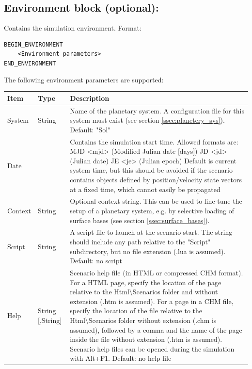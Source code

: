 \documentclass[Orbiter Developer Manual.tex]{subfiles}
\begin{document}
\subsection*{Environment block (optional):}
Contains the simulation environment. Format:

\begin{lstlisting}[language=OSFS]
BEGIN_ENVIRONMENT
	<Environment parameters>
END_ENVIRONMENT
\end{lstlisting}

\noindent
The following environment parameters are supported:

\begin{table}[H]
	\centering
	\begin{tabularx}{\textwidth}{ |l|l|X| }
	\hline\rule{0pt}{2ex}
	\textbf{Item} & \textbf{Type} & \textbf{Description}\\
	\hline\rule{0pt}{2ex}
	System & String & Name of the planetary system. A configuration file for this system must exist (see section \ref{ssec:planetery_sys}). Default: "Sol"\\
	\hline\rule{0pt}{2ex}
	Date &   & Contains the simulation start time. Allowed formats are:\newline
	MJD <mjd> (Modified Julian date [days])\newline
	JD <jd> (Julian date)\newline
	JE <je> (Julian epoch)\newline
	Default is current system time, but this should be avoided if the scenario contains objects defined by position/velocity  state vectors at a fixed time, which cannot easily be propagated\\
	\hline\rule{0pt}{2ex}
	Context & String & Optional context string. This can be used to fine-tune the setup of a planetary system, e.g. by selective loading of surface bases (see section \ref{ssec:surface_bases}).\\
	\hline\rule{0pt}{2ex}
	Script & String & A script file to launch at the scenario start. The string should include any path relative to the "Script" subdirectory, but no file extension (.lua is assumed). Default: no script\\
	\hline\rule{0pt}{2ex}
	Help & String [,String] & Scenario help file (in HTML or compressed CHM format). For a HTML page, specify the location of the page relative to the Html\textbackslash Scenarios folder and without extension (.htm is assumed). For a page in a CHM file, specify the location of the file relative to the Html\textbackslash Scenarios folder without extension (.chm is assumed), followed by a comma and the name of the page inside the file without extension (.htm is assumed). Scenario help files can be opened during the simulation with Alt+F1. Default: no help file\\

\end{tabularx}
\end{table}
\end{document}

